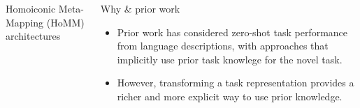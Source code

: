 \documentclass[final]{beamer}
\begin{document}
\begin{frame}[t]{}
\begin{columns}
\begin{column}[t]{0.496\textwidth}
\begin{block}{\huge Homoiconic Meta-Mapping (HoMM) architectures}
\begin{figure}[H]
\end{figure}
\end{block}
\end{column}
\begin{column}[t]{0.248\textwidth}
\begin{block}{\huge Why \& prior work}
\begin{itemize}
\item Prior work has considered zero-shot task performance from language descriptions, with approaches that implicitly use prior task knowlege for the novel task.
\item However, transforming a task representation provides a richer and more explicit way to use prior knowledge.

\end{itemize}
\end{block}
\end{column}
\end{columns}
\end{frame}
\end{document}
